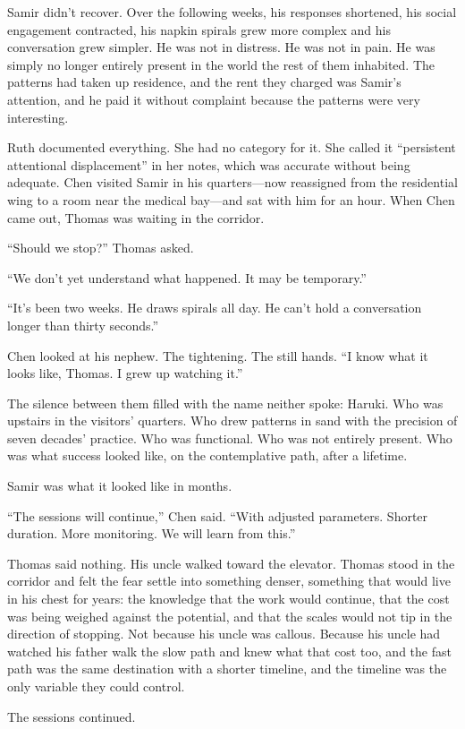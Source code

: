 Samir didn't recover. Over the following weeks, his responses shortened, his social engagement contracted, his napkin spirals grew more complex and his conversation grew simpler. He was not in distress. He was not in pain. He was simply no longer entirely present in the world the rest of them inhabited. The patterns had taken up residence, and the rent they charged was Samir's attention, and he paid it without complaint because the patterns were very interesting.

Ruth documented everything. She had no category for it. She called it ``persistent attentional displacement'' in her notes, which was accurate without being adequate. Chen visited Samir in his quarters---now reassigned from the residential wing to a room near the medical bay---and sat with him for an hour. When Chen came out, Thomas was waiting in the corridor.

``Should we stop?'' Thomas asked.

``We don't yet understand what happened. It may be temporary.''

``It's been two weeks. He draws spirals all day. He can't hold a conversation longer than thirty seconds.''

Chen looked at his nephew. The tightening. The still hands. ``I know what it looks like, Thomas. I grew up watching it.''

The silence between them filled with the name neither spoke: Haruki. Who was upstairs in the visitors' quarters. Who drew patterns in sand with the precision of seven decades' practice. Who was functional. Who was not entirely present. Who was what success looked like, on the contemplative path, after a lifetime.

Samir was what it looked like in months.

``The sessions will continue,'' Chen said. ``With adjusted parameters. Shorter duration. More monitoring. We will learn from this.''

Thomas said nothing. His uncle walked toward the elevator. Thomas stood in the corridor and felt the fear settle into something denser, something that would live in his chest for years: the knowledge that the work would continue, that the cost was being weighed against the potential, and that the scales would not tip in the direction of stopping. Not because his uncle was callous. Because his uncle had watched his father walk the slow path and knew what that cost too, and the fast path was the same destination with a shorter timeline, and the timeline was the only variable they could control.

The sessions continued.
